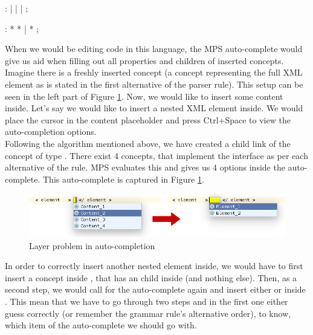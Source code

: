 \begin{antlr}
	    :   
           |   
           |   
           |   
           ;

	    :   \literal{<}  * \literal{>} * \literal{</}  \literal{>}
           |   \literal{<}  * \literal{/>}
           ;
\end{antlr}

When we would be editing code in this language, the MPS auto-complete would give us aid when filling out all properties and children of inserted concepts.
Imagine there is a freshly inserted  concept (a concept representing the full XML element as is stated in the first alternative of the  parser rule).
This setup can be seen in the left part of Figure \ref{fig:layer_problem}.
Now, we would like to insert some content inside.
Let's say we would like to insert a nested XML element inside.
We would place the cursor in the content placeholder and press Ctrl+Space to view the auto-completion options.
\\

Following the algorithm mentioned above, we have created a child link of the  concept of type .
There exist 4 concepts, that implement the  interface as per each alternative of the rule.
MPS evaluates this and gives us 4 options inside the auto-complete.
This auto-complete is captured in Figure \ref{fig:layer_problem}.

\begin{figure}[h]
	\centering
	\includegraphics[width=\textwidth]{./img/layer_problem.png}
	\caption{Layer problem in auto-completion}
	\label{fig:layer_problem}
\end{figure}

In order to correctly insert another nested element inside, we would have to first insert a  concept inside , that has an  child inside (and nothing else).
Then, as a second step, we would call for the auto-complete again and insert either  or  inside .
This mean that we have to go through two steps and in the first one either guess correctly (or remember the grammar rule's alternative order), to know, which item of the auto-complete we should go with.
\\

